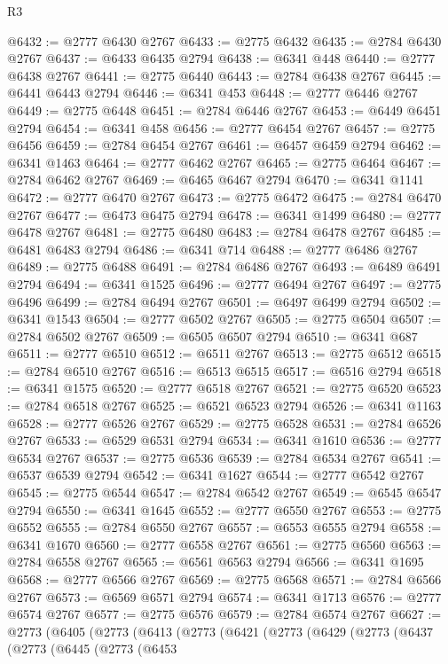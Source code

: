 \begin{lexlean}{R3}
\begin{coremodule}
@6432 := @2777 @6430 @2767
@6433 := @2775 @6432
@6435 := @2784 @6430 @2767
@6437 := @6433 @6435 @2794
@6438 := @6341 @448
@6440 := @2777 @6438 @2767
@6441 := @2775 @6440
@6443 := @2784 @6438 @2767
@6445 := @6441 @6443 @2794
@6446 := @6341 @453
@6448 := @2777 @6446 @2767
@6449 := @2775 @6448
@6451 := @2784 @6446 @2767
@6453 := @6449 @6451 @2794
@6454 := @6341 @458
@6456 := @2777 @6454 @2767
@6457 := @2775 @6456
@6459 := @2784 @6454 @2767
@6461 := @6457 @6459 @2794
@6462 := @6341 @1463
@6464 := @2777 @6462 @2767
@6465 := @2775 @6464
@6467 := @2784 @6462 @2767
@6469 := @6465 @6467 @2794
@6470 := @6341 @1141
@6472 := @2777 @6470 @2767
@6473 := @2775 @6472
@6475 := @2784 @6470 @2767
@6477 := @6473 @6475 @2794
@6478 := @6341 @1499
@6480 := @2777 @6478 @2767
@6481 := @2775 @6480
@6483 := @2784 @6478 @2767
@6485 := @6481 @6483 @2794
@6486 := @6341 @714
@6488 := @2777 @6486 @2767
@6489 := @2775 @6488
@6491 := @2784 @6486 @2767
@6493 := @6489 @6491 @2794
@6494 := @6341 @1525
@6496 := @2777 @6494 @2767
@6497 := @2775 @6496
@6499 := @2784 @6494 @2767
@6501 := @6497 @6499 @2794
@6502 := @6341 @1543
@6504 := @2777 @6502 @2767
@6505 := @2775 @6504
@6507 := @2784 @6502 @2767
@6509 := @6505 @6507 @2794
@6510 := @6341 @687
@6511 := @2777 @6510
@6512 := @6511 @2767
@6513 := @2775 @6512
@6515 := @2784 @6510 @2767
@6516 := @6513 @6515
@6517 := @6516 @2794
@6518 := @6341 @1575
@6520 := @2777 @6518 @2767
@6521 := @2775 @6520
@6523 := @2784 @6518 @2767
@6525 := @6521 @6523 @2794
@6526 := @6341 @1163
@6528 := @2777 @6526 @2767
@6529 := @2775 @6528
@6531 := @2784 @6526 @2767
@6533 := @6529 @6531 @2794
@6534 := @6341 @1610
@6536 := @2777 @6534 @2767
@6537 := @2775 @6536
@6539 := @2784 @6534 @2767
@6541 := @6537 @6539 @2794
@6542 := @6341 @1627
@6544 := @2777 @6542 @2767
@6545 := @2775 @6544
@6547 := @2784 @6542 @2767
@6549 := @6545 @6547 @2794
@6550 := @6341 @1645
@6552 := @2777 @6550 @2767
@6553 := @2775 @6552
@6555 := @2784 @6550 @2767
@6557 := @6553 @6555 @2794
@6558 := @6341 @1670
@6560 := @2777 @6558 @2767
@6561 := @2775 @6560
@6563 := @2784 @6558 @2767
@6565 := @6561 @6563 @2794
@6566 := @6341 @1695
@6568 := @2777 @6566 @2767
@6569 := @2775 @6568
@6571 := @2784 @6566 @2767
@6573 := @6569 @6571 @2794
@6574 := @6341 @1713
@6576 := @2777 @6574 @2767
@6577 := @2775 @6576
@6579 := @2784 @6574 @2767
@6627 := @2773
    (@6405
      (@2773
        (@6413
          (@2773
            (@6421
              (@2773
                (@6429
                  (@2773
                    (@6437
                      (@2773
                        (@6445
                          (@2773
                            (@6453

\end{coremodule}
\end{lexlean}
